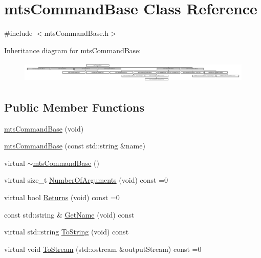 \hypertarget{classmts_command_base}{}\section{mts\+Command\+Base Class Reference}
\label{classmts_command_base}


{\ttfamily \#include $<$mts\+Command\+Base.\+h$>$}

Inheritance diagram for mts\+Command\+Base\+:\begin{figure}[H]
\begin{center}
\leavevmode
\includegraphics[height=1.016703cm]{dc/df0/classmts_command_base}
\end{center}
\end{figure}
\subsection*{Public Member Functions}
\begin{DoxyCompactItemize}
\item 
\hyperlink{classmts_command_base_af88b0fa085b33e9c2232c69218900106}{mts\+Command\+Base} (void)
\item 
\hyperlink{classmts_command_base_aec8441f140eb603abc84e0d047a62fab}{mts\+Command\+Base} (const std\+::string \&name)
\item 
virtual \hyperlink{classmts_command_base_a45ce5ab9a51430b61949beb6fc206c01}{$\sim$mts\+Command\+Base} ()
\item 
virtual size\+\_\+t \hyperlink{classmts_command_base_abde89dfcf0078294f634c232b7537cc3}{Number\+Of\+Arguments} (void) const =0
\item 
virtual bool \hyperlink{classmts_command_base_a0217171a8e7bead32766e94748e11658}{Returns} (void) const =0
\item 
const std\+::string \& \hyperlink{classmts_command_base_ad5c99e2aa1e1a5a13956ace724cb1bc1}{Get\+Name} (void) const 
\end{DoxyCompactItemize}
{\bf }\par
\begin{DoxyCompactItemize}
\item 
virtual std\+::string \hyperlink{classmts_command_base_aec9da20bd72f07b52055dce6e8ebd4c0}{To\+String} (void) const 
\item 
virtual void \hyperlink{classmts_command_base_a0885ce7a5321d7b672694ade780b9d64}{To\+Stream} (std\+::ostream \&output\+Stream) const =0
\end{DoxyCompactItemize}

